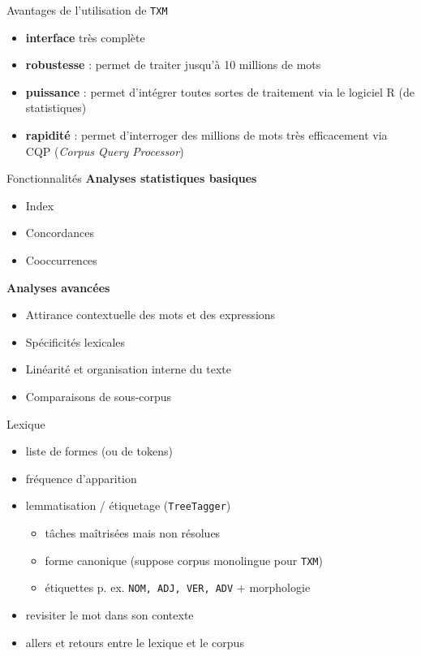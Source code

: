 \documentclass[xetex,xcolor={table,usenames,dvipsnames}]{beamer}
\newcommand{\bolder}[1]{{\color{purple}\bfseries#1}}
\begin{document}
\begin{frame}{Avantages de l'utilisation de \texttt{TXM}}
	\begin{itemize}
		\item \textbf{interface} très complète
		\item \textbf{robustesse} : permet de traiter jusqu'à 10 millions de mots
		\item \textbf{puissance} : permet d'intégrer toutes sortes de traitement via le logiciel \textsc{R} (de
		statistiques)
		\item \textbf{rapidité} : permet d'interroger des millions de mots très eﬃcacement via \textsc{CQP}
		(\textit{Corpus Query Processor})
	\end{itemize}
	\begin{flushright}
		{\small\citep{fort}}
	\end{flushright}
	
\end{frame}
\begin{frame}{Fonctionnalités}
	\bolder{Analyses statistiques basiques}
	\begin{itemize}
		\item Index
		\item Concordances
		\item Cooccurrences
	\end{itemize}
	\bolder{Analyses avancées}
		\begin{itemize}
		\item Attirance contextuelle des mots et des expressions
		\item Spécificités lexicales
		\item Linéarité et organisation interne du texte
		\item Comparaisons de sous-corpus
	\end{itemize}
	

\end{frame}

\begin{frame}{Lexique}
	\begin{itemize}
		\item liste de formes (ou de tokens)
		\item fréquence d'apparition
		\item lemmatisation / étiquetage (\texttt{TreeTagger})
		\begin{itemize}
			\item \textcolor{deepred}{tâches maîtrisées mais non résolues}
			\item forme canonique (suppose corpus monolingue pour \texttt{TXM})
			\item étiquettes p. ex. \texttt{NOM, ADJ, VER, ADV} + morphologie
		\end{itemize}
		\item revisiter le mot dans son contexte
		\item allers et retours entre le lexique et le corpus
	\end{itemize}
\end{frame}
\end{document}
